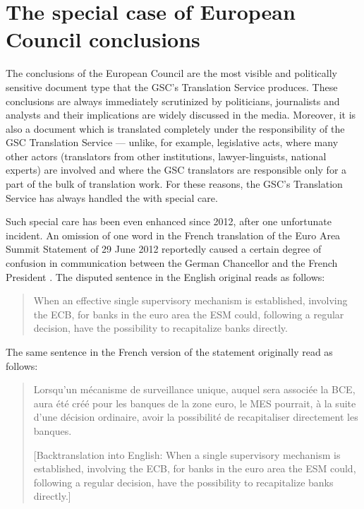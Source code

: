 \documentclass[output=paper]{langsci/langscibook}
\begin{document}
\section{The special case of European Council conclusions}\label{sec:hanzl:hanzl:6}

The conclusions of the European Council are the most visible and politically sensitive document type that the GSC’s Translation Service produces. These conclusions are always immediately scrutinized by politicians, journalists and analysts and their implications are widely discussed in the media. Moreover, it is also a document which is translated completely under the responsibility of the GSC Translation Service — unlike, for example, legislative acts, where many other actors (translators from other institutions, lawyer-linguists, national experts) are involved and where the GSC translators are responsible only for a part of the bulk of translation work. For these reasons, the GSC's Translation Service has always handled the  with special care.

Such special care has been even enhanced since 2012, after one unfortunate incident. An omission of one word in the French translation of the Euro Area Summit Statement of 29 June 2012 reportedly caused a certain degree of confusion in communication between the German Chancellor and the French President \citep{Rousselin2012}. The disputed sentence in the English original reads as follows:

\begin{quote}
{When an effective single supervisory mechanism is established, involving the ECB, for banks in the euro 
area the ESM could, following a regular decision, have the possibility to recapitalize banks directly.}
\end{quote}

The same sentence in the French version of the statement originally read as follows:

\largerpage
\begin{quote}
{Lorsqu'un mécanisme de surveillance unique, auquel sera associée la BCE, aura été créé pour les banques de la zone euro, le MES pourrait, à la suite d'une décision ordinaire, avoir la possibilité de recapitaliser directement les banques.}

[Backtranslation into English: When a single supervisory mechanism is established, involving the ECB, for banks in the euro area the ESM could, following a regular decision, have the possibility to recapitalize banks directly.]
\end{quote}
\end{document}
